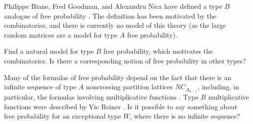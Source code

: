 \documentclass[12pt,letterpaper, reqno]{aimpl}
\begin{document}
\begin{problemblock} 
Philippe Biane, Fred Goodman, and Alexandru Nica have defined a type $B$
analogue of free probability \cite{biane-goodman-nica}. The definition
has been motivated by the combinatorics, and there is currently no model
of this theory (as the large random matrices are a model for type $A$
free probability).

\begin{problem}[5.1] \label{prob:freeprobability}
Find a natural model for type $B$ free probability, which motivates the combinatorics. Is there a corresponding notion of free probability in other types?
\end{problem}

\begin{remark} Many of the formulas of free probability depend on the fact that there is an infinite sequence of type $A$ noncrossing partition lattices $NC_{A_{n-1}}$, including, in particular, the formulas involving multiplicative functions \cite{speicher}. Type $B$ multiplicative functions were described by Vic Reiner \cite{reiner}. Is it possible to say something about free probability for an exceptional type $W$, where there is no infinite sequence?
\end{remark}

\end{problemblock}
\end{document}
